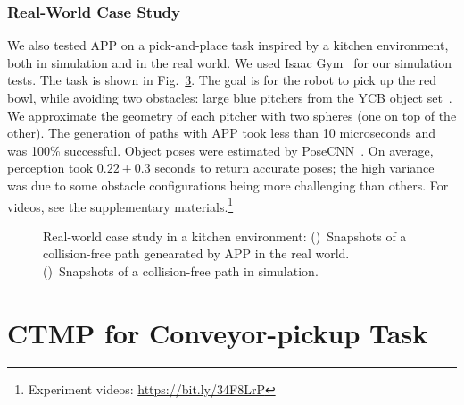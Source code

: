 \documentclass[a4paper]{report}
\begin{document}
\subsection{Real-World Case Study}
We also tested APP on a pick-and-place task inspired by a kitchen environment, both in simulation and in the real world. We used Isaac Gym~\cite{liang2018gpu} for our simulation tests. The task is shown in Fig.~\ref{fig:real-world}. The goal is for the robot to pick up the red bowl, while avoiding two obstacles: large blue pitchers from the YCB object set~\cite{calli2015ycb}. We approximate the geometry of each pitcher with two spheres (one on top of the other).
The generation of paths with APP took less than 10 microseconds and was 100\% successful. Object poses were estimated by PoseCNN~\cite{xiang2017posecnn}.
On average, perception took $0.22 \pm 0.3$ seconds to return accurate poses; the high variance was due to some obstacle configurations being more challenging than others. For videos, see the supplementary materials.\footnote{Experiment videos: \url{https://bit.ly/34F8LrP}}

\begin{figure}[t]
    \centering
    \begin{subfigure}{0.48\textwidth}
        \caption{}
        \label{fig:real}
    \end{subfigure} 
    \begin{subfigure}{0.48\textwidth}
        \caption{}
        \label{fig:sim}
    \end{subfigure}
    \caption{
    Real-world case study in a kitchen environment: 
     ()~Snapshots of a collision-free path genearated by APP in the real world.
    ()~Snapshots of a collision-free path in simulation.
    }
\label{fig:real-world}
\end{figure}

\newpage
\chapter{CTMP for Conveyor-pickup Task}
\label{chap:rss}
\end{document}
